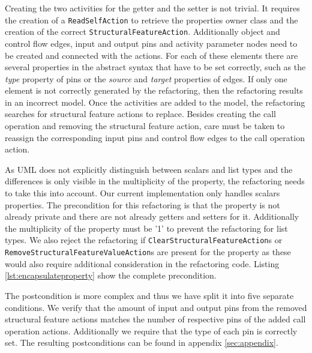 \documentclass{llncs}
\begin{document}
Creating the two activities for the getter and the setter is not trivial. It requires the creation of
a \texttt{Read\-Self\-Action} to retrieve the properties owner class and the creation of the correct \texttt{Structural\-Feature\-Action}.
Additionally object and control flow edges, input and output pins and activity parameter nodes need to be created and connected with the 
actions. For each of these elements there are several properties in the abstract syntax that have to be set correctly, such as the 
\textit{type} property of pins or the \textit{source} and \textit{target} properties of edges. If only one element is not correctly 
generated by the refactoring, then the refactoring results in an incorrect model. Once the activities are added to the model, the 
refactoring searches for structural feature actions to replace. Besides creating the call operation and removing the structural feature 
action, care must be taken to reassign the corresponding input pins and control flow edges to the call operation action.

As UML does not explicitly distinguish between scalars and list types and the differences is only visible
in the multiplicity of the property, the refactoring needs to take this into account. Our current implementation only handles
scalars properties. The precondition for this refactoring is that the property is not already private and there are not already getters 
and setters for it. Additionally the multiplicity of the property must be '1' to prevent the refactoring for list types. We also reject 
the refactoring if \texttt{Clear\-Structural\-Feature\-Action}s or \texttt{Remove\-Structural\-Feature\-Value\-Action}s are present for 
the property as these would also require additional consideration in the refactoring code. Listing \ref{lst:encapsulateproperty} show the 
complete precondition.

The postcondition is more complex and thus we have split it into five separate conditions. We verify that the amount of input and output 
pins from the removed structural feature actions matches the number of respective pins of the added call operation actions. Additionally
we require that the type of each pin is correctly set. The resulting postconditions can be found in appendix \ref{sec:appendix}.
\end{document}
